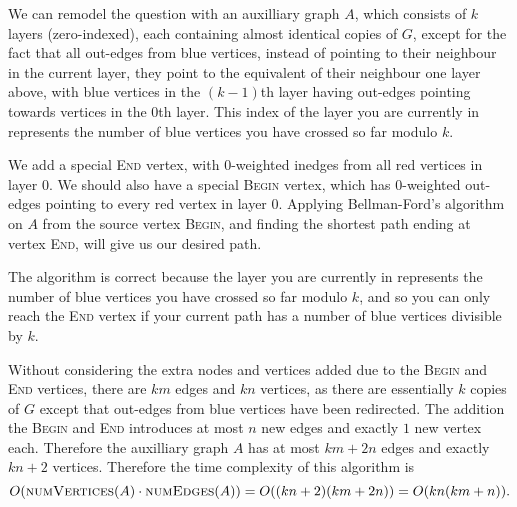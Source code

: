 \documentclass{article}
\begin{document}
\begin{solution}
    We can remodel the question with an auxilliary graph $A$, which consists of $k$ layers (zero-indexed), each containing
    almost identical copies of $G$, except for the fact that all out-edges from blue vertices, 
    instead of pointing to their neighbour in the current layer, they point to the equivalent of their neighbour 
    one layer above, with blue vertices in the $(k-1)$th layer having out-edges pointing towards vertices in the $0$th layer.
    This index of the layer you are currently in represents the number of blue vertices you have crossed so far modulo $k$.

    We add a special \textsc{End} vertex, with $0$-weighted inedges from all red vertices in layer $0$.
    We should also have a special \textsc{Begin} vertex, which has $0$-weighted out-edges pointing to every red vertex in layer $0$.
    Applying Bellman-Ford's algorithm on $A$ from the source vertex \textsc{Begin}, and finding the shortest path ending at vertex \textsc{End},
    will give us our desired path.

    The algorithm is correct because the layer you are currently in represents the number of blue vertices you have crossed so far modulo $k$,
    and so you can only reach the \textsc{End} vertex if your current path has a number of blue vertices divisible by $k$.

    Without considering the extra nodes and vertices added due to the \textsc{Begin} and \textsc{End} vertices, 
    there are $km$ edges and $kn$ vertices, as there are essentially $k$ copies of $G$ except that out-edges from 
    blue vertices have been redirected. The addition the \textsc{Begin} and \textsc{End} introduces at most $n$ new edges and exactly $1$ new vertex each.
    Therefore the auxilliary graph $A$ has at most $km + 2n$ edges and exactly $kn + 2$ vertices. Therefore the time complexity 
    of this algorithm is 
    $$O(\textsc{numVertices}(A)\cdot \textsc{numEdges}(A))=O((kn+2)(km + 2n)) = O(kn(km+n)).$$
\end{solution}
\end{document}
